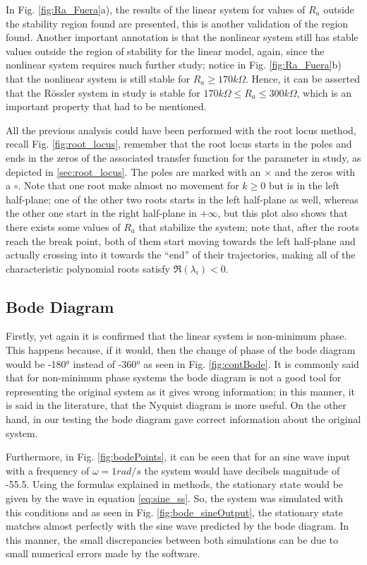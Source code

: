 In Fig. \ref{fig:Ra_Fuera}a), the results of the linear system for values of $R_a$ outside the stability region found are presented, this is another validation of the region found. Another important annotation is that the nonlinear system still has stable values outside the region of stability for the linear model, again, since the nonlinear system requires much further study; notice in Fig. \ref{fig:Ra_Fuera}b) that the nonlinear system is still stable for $R_a\geq170k\Omega$. Hence, it can be asserted that the Rössler system in study is stable for $170k\Omega\leq R_a\leq300k\Omega$, which is an important property that had to be mentioned.

All the previous analysis could have been performed with the root locus method, recall Fig. \ref{fig:root_locus}, remember that the root locus starts in the poles and ends in the zeros of the associated transfer function for the parameter in study, as depicted in \ref{sec:root_locus}. The poles are marked with an $\times$ and the zeros with a $\circ$. Note that one root make almost no movement for $k\geq0$ but is in the left half-plane; one of the other two roots starts in the left half-plane as well, whereas the other one start in the right half-plane in $+\infty$, but this plot also shows that there exists some values of $R_a$ that stabilize the system; note that, after the roots reach the break point, both of them start moving towards the left half-plane and actually crossing into it towards the ``end'' of their trajectories, making all of the characteristic polynomial roots satisfy $\Re(\lambda_i)<0$.

\subsection{Bode Diagram}
Firstly, yet again it is confirmed that the linear system is non-minimum phase. This happens because, if it would, then the change of phase of the bode diagram would be -180° instead of -360° as seen in Fig. \ref{fig:contBode}. It is commonly said that for non-minimum phase systems the bode diagram is not a good tool for representing the original system as it gives wrong information; in this manner, it is said in the literature, that the Nyquist diagram is more useful. On the other hand, in our testing the bode diagram gave correct information about the original system.

Furthermore, in Fig. \ref{fig:bodePoints}, it can be seen that for an sine wave input with a frequency of $\omega = 1 rad/s$ the system would have decibels magnitude of -55.5. Using the formulas explained in methods, the stationary state would be given by the wave in equation \ref{eq:sine_ss}. So, the system was simulated with this conditions and as seen in Fig. \ref{fig:bode_sineOutput}, the stationary state matches almost perfectly with the sine wave predicted by the bode diagram. In this manner, the small discrepancies between both simulations can be due to small numerical errors made by the software.

